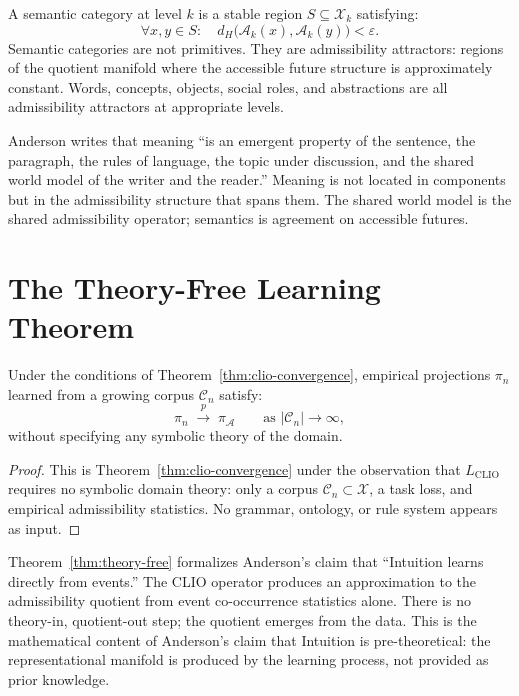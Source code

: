 \documentclass[12pt, a4paper, oneside]{book}
\newcommand{\Adm}{\mathcal{A}}
\newcommand{\X}{\mathcal{X}}
\newcommand{\C}{\mathcal{C}}
\newcommand{\proj}{\pi}
\newcommand{\projA}{\pi_{\!\Adm}}
\newcommand{\dH}{d_H}
\begin{document}
\begin{proposition}
\label{prop:emergent-semantics}
A semantic category at level $k$ is a stable region $S \subseteq \X_k$
satisfying:
\[
  \forall x, y \in S : \quad \dH\bigl(\Adm_k(x), \Adm_k(y)\bigr) < \varepsilon.
\]
Semantic categories are not primitives. They are admissibility attractors:
regions of the quotient manifold where the accessible future structure is
approximately constant. Words, concepts, objects, social roles, and
abstractions are all admissibility attractors at appropriate levels.
\end{proposition}

\begin{remark}
Anderson writes that meaning ``is an emergent property of the sentence,
the paragraph, the rules of language, the topic under discussion, and the
shared world model of the writer and the reader.'' Meaning is not located
in components but in the admissibility structure that spans them. The
shared world model is the shared admissibility operator; semantics is
agreement on accessible futures.
\end{remark}

\section{The Theory-Free Learning Theorem}

\begin{theorem}
\label{thm:theory-free}
Under the conditions of Theorem~\ref{thm:clio-convergence}, empirical
projections $\proj_n$ learned from a growing corpus $\C_n$ satisfy:
\[
  \proj_n \;\xrightarrow{p}\; \projA \qquad \text{as } |\C_n| \to \infty,
\]
without specifying any symbolic theory of the domain.
\end{theorem}

\begin{proof}
This is Theorem~\ref{thm:clio-convergence} under the observation that
$L_{\mathrm{CLIO}}$ requires no symbolic domain theory: only a corpus
$\C_n \subset \X$, a task loss, and empirical admissibility statistics.
No grammar, ontology, or rule system appears as input.
\end{proof}

\begin{remark}
Theorem~\ref{thm:theory-free} formalizes Anderson's claim that
``Intuition learns directly from events.'' The CLIO operator produces
an approximation to the admissibility quotient from event co-occurrence
statistics alone. There is no theory-in, quotient-out step; the quotient
emerges from the data. This is the mathematical content of Anderson's
claim that Intuition is pre-theoretical: the representational manifold
is produced by the learning process, not provided as prior knowledge.
\end{remark}
\end{document}

